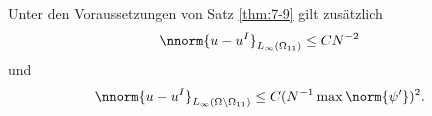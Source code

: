 \begin{lemma}\label{lem:7-10}
  Unter den Voraussetzungen von Satz \ref{thm:7-9} gilt zusätzlich
  \begin{align*}
    \nnorm{u - u^{I}}_{L_{\infty}(\Omega_{11})} \leq C N^{-2}
  \end{align*}
und
\begin{align*}
    \nnorm{u - u^{I}}_{L_{\infty}(\Omega\setminus\Omega_{11})} \leq C (N^{-1} \max\norm{\psi'})^{2}. 
\end{align*}
\end{lemma}


